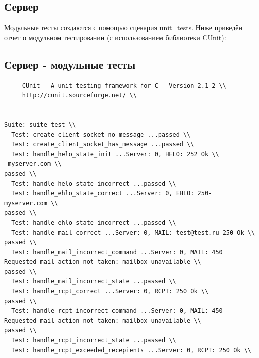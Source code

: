 \documentclass[a4paper,12pt]{report}
\begin{document}
\subsection{Сервер}
Модульные тесты создаются с помощью сценария unit\_tests. Ниже приведён отчет о модульном тестировании (с использованием библиотеки CUnit):
\subsection{Сервер - модульные тесты}
\begin{verbatim}
     CUnit - A unit testing framework for C - Version 2.1-2 \\
     http://cunit.sourceforge.net/ \\


Suite: suite_test \\
  Test: create_client_socket_no_message ...passed \\
  Test: create_client_socket_has_message ...passed \\
  Test: handle_helo_state_init ...Server: 0, HELO: 252 Ok \\
 myserver.com \\
passed \\
  Test: handle_helo_state_incorrect ...passed \\
  Test: handle_ehlo_state_correct ...Server: 0, EHLO: 250- myserver.com \\
passed \\
  Test: handle_ehlo_state_incorrect ...passed \\
  Test: handle_mail_correct ...Server: 0, MAIL: test@test.ru 250 Ok \\
passed \\
  Test: handle_mail_incorrect_command ...Server: 0, MAIL: 450 Requested mail action not taken: mailbox unavailable \\
passed \\
  Test: handle_mail_incorrect_state ...passed \\
  Test: handle_rcpt_correct ...Server: 0, RCPT: 250 Ok \\
passed \\
  Test: handle_rcpt_incorrect_command ...Server: 0, MAIL: 450 Requested mail action not taken: mailbox unavailable \\
passed \\
  Test: handle_rcpt_incorrect_state ...passed \\
  Test: handle_rcpt_exceeded_recepients ...Server: 0, RCPT: 250 Ok \\

\end{verbatim}
\end{document}
